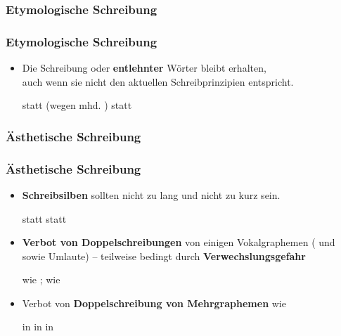 \subsubsection{Etymologische Schreibung}


\begin{frame}
\frametitle{Etymologische Schreibung}

\begin{itemize}
	\item Die Schreibung  oder \textbf{entlehnter} Wörter bleibt erhalten,\\
	auch wenn sie nicht den aktuellen Schreibprinzipien entspricht.
	
	\eal
		\ex {} statt  (wegen mhd. )
		\ex {} statt 
	\zl

\end{itemize}

\end{frame}


\subsubsection{Ästhetische Schreibung}


\begin{frame}
\frametitle{Ästhetische Schreibung}

\begin{itemize}
	\item \textbf{Schreibsilben} sollten nicht zu lang und nicht zu kurz sein.
	
	\eal
	\ex {} statt 
	\ex {} statt 
	\zl

\pause 
	
	\item \textbf{Verbot von Doppelschreibungen} von einigen Vokalgraphemen ( und  sowie Umlaute) -- teilweise bedingt durch \textbf{Verwechslungsgefahr}
	
	\ea
	 wie ;  wie 
	\z
	
\pause 
		
	\item Verbot von \textbf{Doppelschreibung von Mehrgraphemen} wie
	
	\eal
		\ex {} in 
		\ex {} in  
		\ex {} in 
	\zl
	
\end{itemize}

\end{frame}


